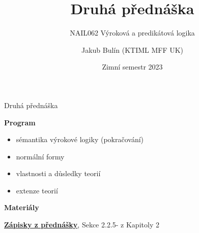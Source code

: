 \documentclass{beamer}
\title{Druhá přednáška}
\subtitle{NAIL062 Výroková a predikátová logika}
\author{Jakub Bulín (KTIML MFF UK)}
\date{Zimní semestr 2023}
\begin{document}
\maketitle


\begin{frame}{Druhá přednáška}

    \textbf{Program}
        \begin{itemize}
            \item sémantika výrokové logiky (pokračování)
            \item normální formy
            \item vlastnosti a důsledky teorií
            \item extenze teorií
        \end{itemize}   

    \textbf{Materiály}

        \href{https://github.com/jbulin-mff-uk/nail062/raw/main/lecture/lecture-notes/lecture-notes.pdf}{\alert{\textbf{Zápisky z přednášky}}}, Sekce 2.2.5- z Kapitoly 2

\end{frame}
\end{document}
